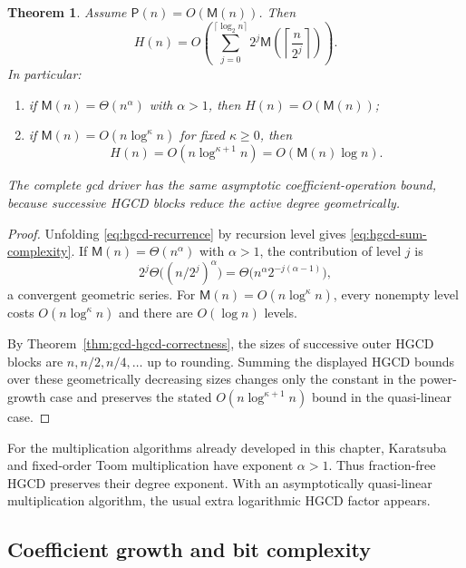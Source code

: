 \documentclass[11pt]{book}
\newtheorem{theorem}{Theorem}[section]
\theoremstyle{definition}
\begin{document}
\begin{theorem}\label{thm:hgcd-coefficient-complexity}
Assume $\mathsf P(n)=O(\mathsf M(n))$.
Then
\begin{equation}\label{eq:hgcd-sum-complexity}
 H(n)
 =O\!\left(
   \sum_{j=0}^{\lceil\log_2n\rceil}
   2^j\mathsf M\!\left(\left\lceil\frac{n}{2^j}\right\rceil\right)
  \right).
\end{equation}
In particular:
\begin{enumerate}
 \item if $\mathsf M(n)=\Theta(n^\alpha)$ with $\alpha>1$, then
 $H(n)=O(\mathsf M(n))$;
 \item if $\mathsf M(n)=O(n\log^\kappa n)$ for fixed $\kappa\ge0$, then
 \[
  H(n)=O(n\log^{\kappa+1}n)
      =O(\mathsf M(n)\log n).
 \]
\end{enumerate}
The complete gcd driver has the same asymptotic coefficient-operation bound,
because successive HGCD blocks reduce the active degree geometrically.
\end{theorem}

\begin{proof}
Unfolding \eqref{eq:hgcd-recurrence} by recursion level gives
\eqref{eq:hgcd-sum-complexity}.  If
$\mathsf M(n)=\Theta(n^\alpha)$ with $\alpha>1$, the contribution of level
$j$ is
\[
 2^j\Theta\bigl((n/2^j)^\alpha\bigr)
 =\Theta\bigl(n^\alpha2^{-j(\alpha-1)}\bigr),
\]
a convergent geometric series.  For
$\mathsf M(n)=O(n\log^\kappa n)$, every nonempty level costs
$O(n\log^\kappa n)$ and there are $O(\log n)$ levels.

By Theorem~\ref{thm:gcd-hgcd-correctness}, the sizes of successive outer
HGCD blocks are $n,n/2,n/4,\ldots$ up to rounding.  Summing the displayed
HGCD bounds over these geometrically decreasing sizes changes only the
constant in the power-growth case and preserves the stated
$O(n\log^{\kappa+1}n)$ bound in the quasi-linear case.
\end{proof}

For the multiplication algorithms already developed in this chapter,
Karatsuba and fixed-order Toom multiplication have exponent $\alpha>1$.
Thus fraction-free HGCD preserves their degree exponent.  With an
asymptotically quasi-linear multiplication algorithm, the usual extra
logarithmic HGCD factor appears.

\subsection{Coefficient growth and bit complexity}
\end{document}
